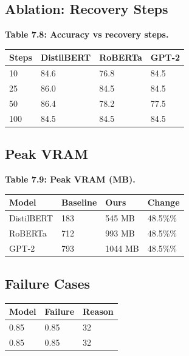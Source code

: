 \subsection{Ablation: Recovery Steps}

\textbf{Table 7.8: Accuracy vs recovery steps.}

\begin{table}[H]
\centering
\small
\begin{tabular}{llll}
\toprule
\textbf{Steps} & \textbf{DistilBERT} & \textbf{RoBERTa} & \textbf{GPT-2} \\
\midrule
10 & 84.6 & 76.8 & 84.5 \\
25 & 86.0 & 84.5 & 84.5 \\
50 & 86.4 & 78.2 & 77.5 \\
100 & 84.5 & 84.5 & 84.5 \\
\bottomrule
\end{tabular}
\end{table}

\subsection{Peak VRAM}

\textbf{Table 7.9: Peak VRAM (MB).}

\begin{table}[H]
\centering
\small
\begin{tabular}{llll}
\toprule
\textbf{Model} & \textbf{Baseline} & \textbf{Ours} & \textbf{Change} \\
\midrule
DistilBERT & 183 & 545 MB & 48.5\%\% \\
RoBERTa & 712 & 993 MB & 48.5\%\% \\
GPT-2 & 793 & 1044 MB & 48.5\%\% \\
\bottomrule
\end{tabular}
\end{table}

\subsection{Failure Cases}

\begin{table}[H]
\centering
\small
\begin{tabular}{lll}
\toprule
\textbf{Model} & \textbf{Failure} & \textbf{Reason} \\
\midrule
0.85 & 0.85 & 32 \\
0.85 & 0.85 & 32 \\
\bottomrule
\end{tabular}
\end{table}

